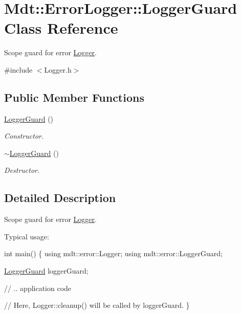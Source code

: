 \hypertarget{class_mdt_1_1_error_logger_1_1_logger_guard}{}\section{Mdt\+:\+:Error\+Logger\+:\+:Logger\+Guard Class Reference}
\label{class_mdt_1_1_error_logger_1_1_logger_guard}


Scope guard for error \hyperlink{class_mdt_1_1_error_logger_1_1_logger}{Logger}.  




{\ttfamily \#include $<$Logger.\+h$>$}

\subsection*{Public Member Functions}
\begin{DoxyCompactItemize}
\item 
\hyperlink{class_mdt_1_1_error_logger_1_1_logger_guard_a206dae2204438c86ce5fb70470b800e4}{Logger\+Guard} ()
\begin{DoxyCompactList}\small\item\em Constructor. \end{DoxyCompactList}\item 
\hyperlink{class_mdt_1_1_error_logger_1_1_logger_guard_a46942a98dcdf36a9df5857e9114e7466}{$\sim$\+Logger\+Guard} ()
\begin{DoxyCompactList}\small\item\em Destructor. \end{DoxyCompactList}\end{DoxyCompactItemize}


\subsection{Detailed Description}
Scope guard for error \hyperlink{class_mdt_1_1_error_logger_1_1_logger}{Logger}. 

Typical usage\+: 
\begin{DoxyCode}
\textcolor{keywordtype}{int} main()
\{
  \textcolor{keyword}{using} mdt::error::Logger;
  \textcolor{keyword}{using} mdt::error::LoggerGuard;

  \hyperlink{class_mdt_1_1_error_logger_1_1_logger_guard_a206dae2204438c86ce5fb70470b800e4}{LoggerGuard} loggerGuard;

  \textcolor{comment}{// .. application code}

  \textcolor{comment}{// Here, Logger::cleanup() will be called by loggerGuard.}
\}
\end{DoxyCode}
 


